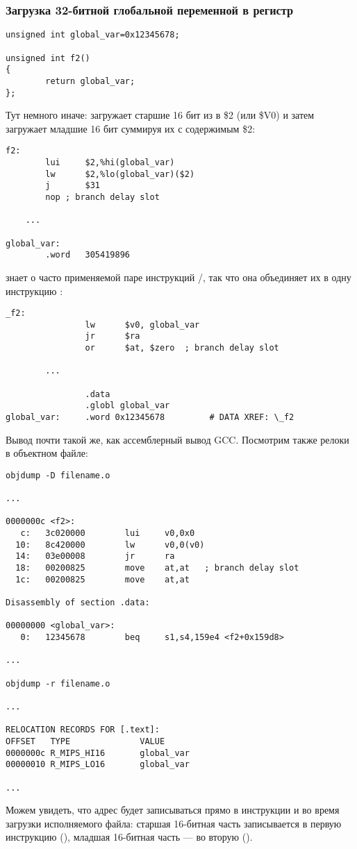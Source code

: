 \subsubsection{Загрузка 32-битной глобальной переменной в регистр}

\begin{lstlisting}[style=customc]
unsigned int global_var=0x12345678;

unsigned int f2()
{
        return global_var;
};
\end{lstlisting}


Тут немного иначе:  загружает старшие 16 бит из  в \$2 (или \$V0) и затем  загружает младшие
16 бит суммируя их с содержимым \$2:

\begin{lstlisting}[caption=GCC 4.4.5 -O3 (\assemblyOutput),style=customasmMIPS]
f2:
        lui     $2,%hi(global_var)
        lw      $2,%lo(global_var)($2)
        j       $31
        nop	; branch delay slot

	...

global_var:
        .word   305419896
\end{lstlisting}

\IDA знает о часто применяемой паре инструкций /, так что она объединяет их в одну инструкцию :

\begin{lstlisting}[caption=GCC 4.4.5 -O3 (IDA),style=customasmMIPS]
_f2:
                lw      $v0, global_var
                jr      $ra
                or      $at, $zero	; branch delay slot

		...

                .data
                .globl global_var
global_var:     .word 0x12345678         # DATA XREF: \_f2
\end{lstlisting}

Вывод  почти такой же, как ассемблерный вывод GCC.
Посмотрим также релоки в объектном файле:

\begin{lstlisting}[caption=objdump,style=customasmMIPS]
objdump -D filename.o

...

0000000c <f2>:
   c:   3c020000        lui     v0,0x0
  10:   8c420000        lw      v0,0(v0)
  14:   03e00008        jr      ra
  18:   00200825        move    at,at	; branch delay slot
  1c:   00200825        move    at,at

Disassembly of section .data:

00000000 <global_var>:
   0:   12345678        beq     s1,s4,159e4 <f2+0x159d8>

...

objdump -r filename.o

...

RELOCATION RECORDS FOR [.text]:
OFFSET   TYPE              VALUE
0000000c R_MIPS_HI16       global_var
00000010 R_MIPS_LO16       global_var

...

\end{lstlisting}

Можем увидеть, что адрес  будет записываться прямо в инструкции  и  во время загрузки исполняемого
файла:
старшая 16-битная часть  записывается в первую инструкцию (), младшая 16-битная часть ---
во вторую ().

